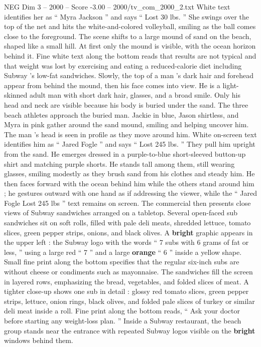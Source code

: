 \begin{textsample}{NEG Dim 3 – 2000 – Score -3.00 – 2000/tv\_com\_2000\_2.txt}
White text identifies her as “ Myra Jackson ” and says “ Lost 30 lbs. ” She swings over the top of the net and hits the white-and-colored volleyball, smiling as the ball comes close to the foreground.
The scene shifts to a large mound of sand on the beach, shaped like a small hill.
At first only the mound is visible, with the ocean horizon behind it.
Fine white text along the bottom reads that results are not typical and that weight was lost by exercising and eating a reduced-calorie diet including Subway ’s low-fat sandwiches.
Slowly, the top of a man ’s dark hair and forehead appear from behind the mound, then his face comes into view.
He is a light-skinned adult man with short dark hair, glasses, and a broad smile.
Only his head and neck are visible because his body is buried under the sand.
The three beach athletes approach the buried man.
Jackie in blue, Jason shirtless, and Myra in pink gather around the sand mound, smiling and helping uncover him.
The man ’s head is seen in profile as they move around him.
White on-screen text identifies him as “ Jared Fogle ” and says “ Lost 245 lbs. ” They pull him upright from the sand.
He emerges dressed in a purple-to-blue short-sleeved button-up shirt and matching purple shorts.
He stands tall among them, still wearing glasses, smiling modestly as they brush sand from his clothes and steady him.
He then faces forward with the ocean behind him while the others stand around him ; he gestures outward with one hand as if addressing the viewer, while the “ Jared Fogle Lost 245 lbs ” text remains on screen.
The commercial then presents close views of Subway sandwiches arranged on a tabletop.
Several open-faced sub sandwiches sit on soft rolls, filled with pale deli meats, shredded lettuce, tomato slices, green pepper strips, onions, and black olives.
A \textbf{bright} graphic appears in the upper left : the Subway logo with the words “ 7 subs with 6 grams of fat or less, ” using a large red “ 7 ” and a large \textbf{orange} “ 6 ” inside a yellow shape.
Small fine print along the bottom specifies that the regular six-inch subs are without cheese or condiments such as mayonnaise.
The sandwiches fill the screen in layered rows, emphasizing the bread, vegetables, and folded slices of meat.
A tighter close-up shows one sub in detail : glossy red tomato slices, green pepper strips, lettuce, onion rings, black olives, and folded pale slices of turkey or similar deli meat inside a roll.
Fine print along the bottom reads, “ Ask your doctor before starting any weight-loss plan. ” Inside a Subway restaurant, the beach group stands near the entrance with repeated Subway logos visible on the \textbf{bright} windows behind them.

\end{textsample}
